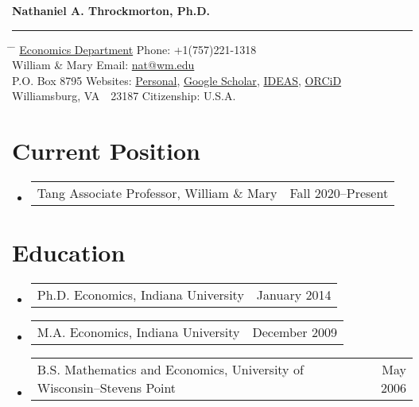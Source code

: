 \documentclass[10pt,letterpaper,en-US]{article}
\makeatletter
\newcommand{\name}{Nathaniel A. Throckmorton, Ph.D.}
\newcommand{\itemrow}[2]
{\begin{tabular*}{\linewidth}{l@{\extracolsep{\fill}}r}
	#1 & #2 \\
\end{tabular*}}
\makeatother
\begin{document}

{\Large \textbf{\name}}
\vspace{4pt}
\hrule
\vspace{-4pt}
\begin{tabbing}
    \hspace{3.25in}         	\=  \hspace{3.25in}  \= \kill
    \href{https://www.wm.edu/as/economics/}{Economics Department} 	\>  Phone: +1(757)221-1318                     \\
    William \& Mary             \>  Email: \href{mailto:nat@wm.edu}{nat@wm.edu}          \\
    P.O. Box 8795  				\>  Websites: \href{https://nathrockmorton.people.wm.edu/}{Personal}, \href{https://scholar.google.com/citations?user=OYdRwzYAAAAJ}{Google Scholar}, \href{https://ideas.repec.org/f/pth237.html}{IDEAS}, \href{https://orcid.org/0000-0002-9671-757X}{ORCiD} \\
    Williamsburg, VA~~23187	    \>  Citizenship: U.S.A.
\end{tabbing}

\section*{Current Position}
\begin{itemize}
	\item \itemrow{Tang Associate Professor, William \& Mary}{Fall 2020--Present}
\end{itemize}

\section*{Education}
\begin{itemize}
	\item
    \itemrow{Ph.D. Economics, Indiana University}{January 2014}
	\item
    \itemrow{M.A. Economics, Indiana University}{December 2009}
	\item
    \itemrow{B.S. Mathematics and Economics, University of Wisconsin--Stevens Point}{May 2006}
\end{itemize}
\end{document}
